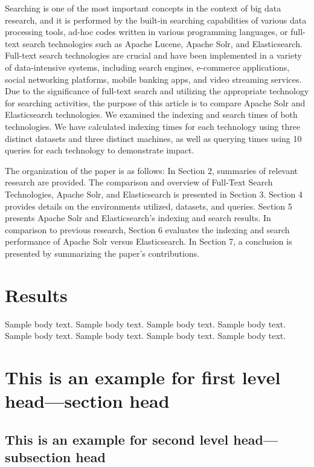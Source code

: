 \documentclass[sn-mathphys]{sn-jnl}%
\theoremstyle{thmstyleone}%
\theoremstyle{thmstyletwo}%
\theoremstyle{thmstylethree}%
\begin{document}
Searching is one of the most important concepts in the context of big data research, and it is performed by the built-in searching capabilities of various data processing tools, ad-hoc codes written in various programming languages, or full-text search technologies such as Apache Lucene, Apache Solr, and Elasticsearch. Full-text search technologies are crucial and have been implemented in a variety of data-intensive systems, including search engines, e-commerce applications, social networking platforms, mobile banking apps, and video streaming services. Due to the significance of full-text search and utilizing the appropriate technology for searching activities, the purpose of this article is to compare Apache Solr and Elasticsearch technologies. We examined the indexing and search times of both technologies. We have calculated indexing times for each technology using three distinct datasets and three distinct machines, as well as querying times using 10 queries for each technology to demonstrate impact.

The organization of the paper is as follows: In Section 2, summaries of relevant research are provided. The comparison and overview of Full-Text Search Technologies, Apache Solr, and Elasticsearch is presented in Section 3. Section 4 provides details on the environments utilized, datasets, and queries. Section 5 presents Apache Solr and Elasticsearch's indexing and search results. In comparison to previous research, Section 6 evaluates the indexing and search performance of Apache Solr versus Elasticsearch. In Section 7, a conclusion is presented by summarizing the paper's contributions.

\section{Results}\label{sec2}

Sample body text. Sample body text. Sample body text. Sample body text. Sample body text. Sample body text. Sample body text. Sample body text.

\section{This is an example for first level head---section head}\label{sec3}

\subsection{This is an example for second level head---subsection head}\label{subsec2}
\end{document}
